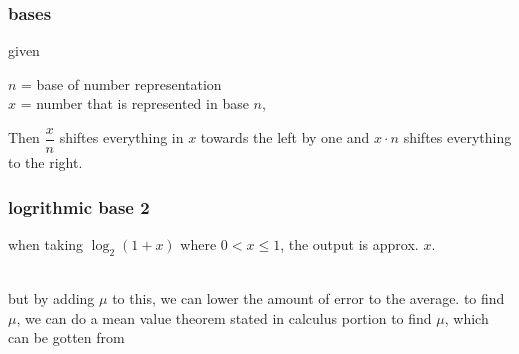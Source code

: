 \documentclass{article} %
\begin{document}
        \subsubsection{bases}
        given  \begin{center}
            $n$ = base of number representation\\
            $x$ = number that is represented in base $n$,
        \end{center}
        Then $\dfrac{x}{n}$ shiftes everything in $x$ towards the left by one and $x\cdot n$ shiftes everything to the right.
        \subsubsection{logrithmic base 2}
        when taking $\log_2(1+x)$ where $0<x \leq1$, the output is approx. $x$.\\
        \\but by adding $\mu$ to this, we can lower the amount of error to the average.
        to find $\mu$, we can do a mean value theorem stated in calculus portion to find $\mu$, which can be gotten from
\end{document}

